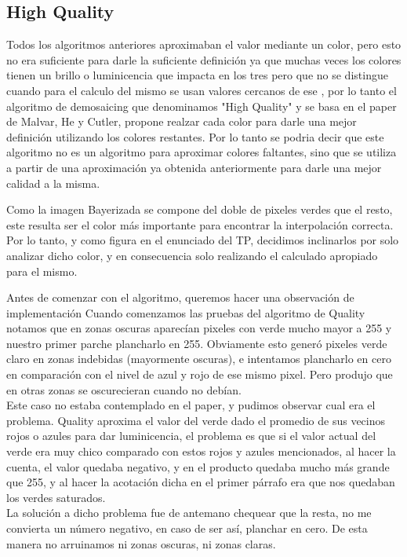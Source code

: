 \subsection{High Quality}

Todos los algoritmos anteriores aproximaban el valor mediante un color, pero esto no era suficiente para darle la suficiente definición ya que muchas veces los colores tienen un brillo o luminicencia que impacta en los tres pero que no se distingue cuando para el calculo del mismo se usan valores cercanos de ese , por lo tanto el algoritmo de demosaicing que denominamos "High Quality" y se basa en el paper de Malvar, He y Cutler, propone realzar cada color para darle una mejor definición utilizando los colores restantes. Por lo tanto se podria decir que este algoritmo no es un algoritmo para aproximar colores faltantes, sino que se utiliza a partir de una aproximación ya obtenida anteriormente para darle una mejor calidad a la misma.

Como la imagen Bayerizada se compone del doble de pixeles verdes que el resto, este resulta ser el color más importante para encontrar la interpolación correcta. Por lo tanto, y como figura en el enunciado del TP, decidimos inclinarlos por solo analizar dicho color, y en consecuencia solo realizando el calculado apropiado para el mismo.

Antes de comenzar con el algoritmo, queremos hacer una observación de implementación
Cuando comenzamos las pruebas del algoritmo de Quality notamos que en zonas oscuras aparecían pixeles con verde mucho mayor a 255 y nuestro primer parche plancharlo en 255. Obviamente esto generó pixeles verde claro en zonas indebidas (mayormente oscuras), e intentamos plancharlo en cero en comparación con el nivel de azul y rojo de ese mismo pixel. Pero produjo que en otras zonas se oscurecieran cuando no debían.\\
Este caso no estaba contemplado en el paper, y pudimos observar cual era el problema. Quality aproxima el valor del verde dado el promedio de sus vecinos rojos o azules para dar luminicencia, el problema es que si el valor actual del verde era muy chico comparado con estos rojos y azules mencionados, al hacer la cuenta, el valor quedaba negativo, y en el producto quedaba mucho más grande que 255, y al hacer la acotación dicha en el primer párrafo era que nos quedaban los verdes saturados.\\
La solución a dicho problema fue de antemano chequear que la resta, no me convierta un número negativo, en caso de ser así, planchar en cero. De esta manera no arruinamos ni zonas oscuras, ni zonas claras.

